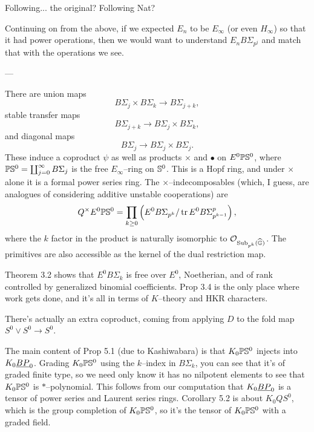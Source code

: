 





Following... the original? Following Nat?

Continuing on from the above, if we expected $E_n$ to be $E_\infty$ (or even $H_\infty$) so that it had power operations, then we would want to understand $E_n B\Sigma_{p^j}$ and match that with the operations we see.

---

There are union maps \[B\Sigma_j \times B\Sigma_k \to B\Sigma_{j+k},\] stable transfer maps \[B\Sigma_{j+k} \to B\Sigma_j \times B\Sigma_k,\] and diagonal maps \[B\Sigma_j \to B\Sigma_j \times B\Sigma_j.\]  These induce a coproduct $\psi$ as well as products $\times$ and $\bullet$ on $E^0 \P \S^0$, where $\P\S^0 = \coprod_{j=0}^\infty B\Sigma_j$ is the free $E_\infty$--ring on $\S^0$.  This is a Hopf ring, and under $\times$ alone it is a formal power series ring.  The $\times$--indecomposables (which, I guess, are analogues of considering additive unstable cooperations) are \[Q^\times E^0 \P\S^0 = \prod_{k \ge 0} \left( E^0 B\Sigma_{p^k} / \operatorname{tr} E^0 B\Sigma_{p^{k-1}}^p \right),\] where the $k${\th} factor in the product is naturally isomorphic to $\sheaf{O}_{\Sub_{p^k}(\G)}$.  The primitives are also accessible as the kernel of the dual restriction map.

Theorem 3.2 shows that $E^0 B\Sigma_k$ is free over $E^0$, Noetherian, and of rank controlled by generalized binomial coefficients.  Prop 3.4 is the only place where work gets done, and it's all in terms of $K$--theory and HKR characters.

There's actually an extra coproduct, coming from applying $D$ to the fold map $S^0 \vee S^0 \to S^0$.

The main content of Prop 5.1 (due to Kashiwabara) is that $K_0 \P \S^0$ injects into $K_0 \OS{BP}{0}$.  Grading $K_0 \P \S^0$ using the $k$--index in $B\Sigma_k$, you can see that it's of graded finite type, so we need only know it has no nilpotent elements to see that $K_0 \P \S^0$ is $\ast$--polynomial.  This follows from our computation that $K_0 \OS{BP}{0}$ is a tensor of power series and Laurent series rings.  Corollary 5.2 is about $K_0 Q S^0$, which is the group completion of $K_0 \P \S^0$, so it's the tensor of $K_0 \P \S^0$ with a graded field.

